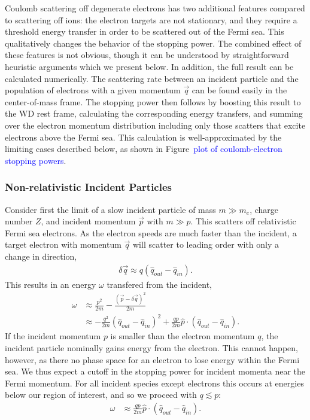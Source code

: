 \documentclass[twocolumn,preprintnumbers,amsmath,amssymb,prl, superscriptaddress]{revtex4}
\begin{document}
\begin{appendices}
Coulomb scattering off degenerate electrons has two additional features compared to scattering off ions: the electron targets are not stationary, and they require a threshold energy transfer in order to be scattered out of the Fermi sea.
This qualitatively changes the behavior of the stopping power.
The combined effect of these features is not obvious, though it can be understood by straightforward heuristic arguments which we present below.
In addition, the full result can be calculated numerically.
The scattering rate between an incident particle and the population of electrons with a given momentum $\vec{q}$ can be found easily in the center-of-mass frame.
The stopping power then follows by boosting this result to the WD rest frame, calculating the corresponding energy transfers, and summing over the electron momentum distribution including only those scatters that excite electrons above the Fermi sea.
This calculation is well-approximated by the limiting cases described below, as shown in Figure~\textcolor{blue}{plot of coulomb-electron stopping powers}.

\subsubsection{Non-relativistic Incident Particles}
Consider first the limit of a slow incident particle of mass $m \gg m_e$, charge number $Z$, and incident momentum $\vec{p}$ with $m \gg p$.
This scatters off relativistic Fermi sea electrons.
As the electron speeds are much faster than the incident, a target electron with momentum $\vec{q}$ will scatter to leading order with only a change in direction,
\begin{align}
  \delta \vec{q} \approx q \left(\hat{q}_{out} - \hat{q}_{in}\right).
\end{align}
This results in an energy $\omega$ transfered from the incident,
\begin{align}
  \omega &\approx \frac{p^2}{2 m} -
    \frac{\left(\vec{p} - \delta \vec{q}\right)^2}{2 m} \\
    &\approx -\frac{q^2}{2m}  \left(\hat{q}_{out} - \hat{q}_{in}\right)^2
  + \frac{q p}{2m} \hat{p} \cdot \left(\hat{q}_{out} - \hat{q}_{in}\right).
\end{align}
If the incident momentum $p$ is smaller than the electron momentum $q$, the incident particle nominally gains energy from the electron.
This cannot happen, however, as there no phase space for an electron to lose energy within the Fermi sea.
We thus expect a cutoff in the stopping power for incident momenta near the Fermi momentum.
For all incident species except electrons this occurs at energies below our region of interest, and so we proceed with $q \lesssim p$:
\begin{align}
  \omega &\approx \frac{q p}{2m}
  \hat{p} \cdot \left(\hat{q}_{out} - \hat{q}_{in}\right).
\end{align}


\end{appendices}
\end{document}
